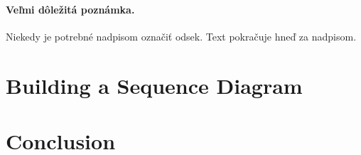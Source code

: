 \documentclass[10pt,twoside,slovak,a4paper]{article}
\begin{document}

\paragraph{Veľmi dôležitá poznámka.}
Niekedy je potrebné nadpisom označiť odsek. Text pokračuje hneď za nadpisom.



\section{Building a Sequence Diagram} \label{building}





\section{Conclusion} \label{Conclusion} %






\end{document}
